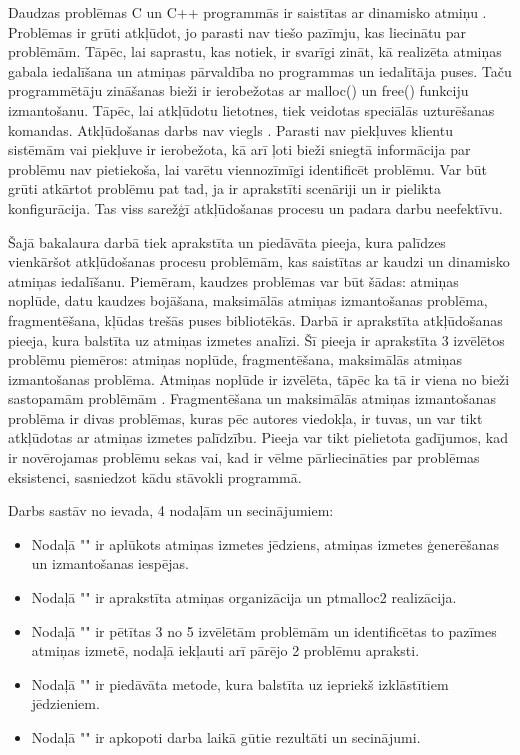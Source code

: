 ﻿Daudzas problēmas C un C++ programmās ir saistītas ar dinamisko atmiņu \cite{TFM}.
Problēmas ir grūti atkļūdot, jo parasti nav tiešo pazīmju, kas liecinātu par problēmām.
Tāpēc, lai saprastu, kas notiek, ir svarīgi zināt, kā realizēta atmiņas gabala iedalīšana un atmiņas pārvaldība no programmas un iedalītāja puses.
Taču programmētāju zināšanas bieži ir ierobežotas ar malloc() un free() funkciju izmantošanu. 
Tāpēc, lai atkļūdotu lietotnes, tiek veidotas speciālās uzturēšanas komandas.
Atkļūdošanas darbs nav viegls \cite{ER}. Parasti nav piekļuves klientu sistēmām vai piekļuve ir ierobežota, kā arī ļoti bieži sniegtā informācija par problēmu nav pietiekoša, lai varētu viennozīmīgi identificēt problēmu.
Var būt grūti atkārtot problēmu pat tad, ja ir aprakstīti scenāriji un ir pielikta konfigurācija.
Tas viss sarežģī atkļūdošanas procesu un padara darbu neefektīvu.

Šajā bakalaura darbā tiek aprakstīta un piedāvāta pieeja, kura palīdzes vienkāršot atkļūdošanas procesu problēmām, kas saistītas ar kaudzi un dinamisko atmiņas iedalīšanu.
Piemēram, kaudzes problēmas var būt šādas: atmiņas noplūde, datu kaudzes bojāšana, maksimālās atmiņas izmantošanas problēma, fragmentēšana, kļūdas trešās puses bibliotēkās.
Darbā ir aprakstīta atkļūdošanas pieeja, kura balstīta uz atmiņas izmetes analīzi.
Šī pieeja ir aprakstīta 3 izvēlētos problēmu piemēros: atmiņas noplūde, fragmentēšana, maksimālās atmiņas izmantošanas problēma.
Atmiņas noplūde ir izvēlēta, tāpēc ka tā ir viena no bieži sastopamām problēmām \cite{GNED}.
Fragmentēšana un maksimālās atmiņas izmantošanas problēma ir divas problēmas, kuras pēc autores viedokļa, ir tuvas, un var tikt atkļūdotas ar atmiņas izmetes palīdzību.
Pieeja var tikt pielietota gadījumos, kad ir novērojamas problēmu sekas vai, kad ir vēlme pārliecināties par problēmas eksistenci, sasniedzot kādu stāvokli programmā.



Darbs sastāv no ievada, 4 nodaļām un secinājumiem:
\begin{itemize}
    \item Nodaļā "{\@nodone}" ir aplūkots atmiņas izmetes jēdziens, atmiņas izmetes ģenerēšanas un izmantošanas iespējas.
    \item Nodaļā "{\@nodtwo}" ir aprakstīta atmiņas organizācija un  ptmalloc2 realizācija. 
    \item Nodaļā "{\@nodthree}" ir pētītas 3 no 5 izvēlētām problēmām un identificētas to pazīmes atmiņas izmetē, nodaļā iekļauti arī pārējo 2 problēmu apraksti.
    \item Nodaļā "{\@nodfour}" ir piedāvāta metode, kura balstīta uz iepriekš izklāstītiem jēdzieniem.
    \item Nodaļā "{\@nodsix}" ir apkopoti darba laikā gūtie rezultāti un secinājumi.
\end{itemize} 
